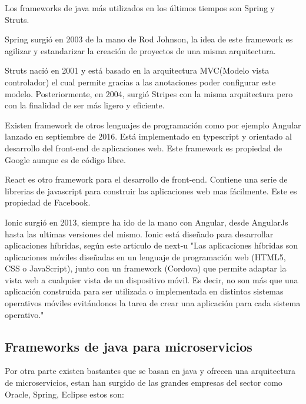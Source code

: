 \documentclass[12pt]{report} %
\begin{document}
 Los frameworks de java más utilizados en los últimos tiempos son Spring y Struts.
 
 Spring surgió en 2003 de la mano de Rod Johnson, la idea de este framework es agilizar y estandarizar la creación de proyectos de una misma arquitectura. 
 
 Struts nació en 2001 y está basado en la arquitectura MVC(Modelo vista controlador) el cual permite gracias a las anotaciones poder configurar este modelo. Posteriormente, en 2004, surgió Stripes con la misma arquitectura pero con la finalidad de ser más ligero y eficiente.
 
 Existen framework de otros lenguajes de programación como por ejemplo Angular lanzado en septiembre de 2016. Está implementado en typescript y orientado al desarrollo del front-end de aplicaciones web. Este framework es propiedad de Google aunque es de código libre.
 
 React es otro framework para el desarrollo de front-end. Contiene una serie de librerias de javascript para construir las aplicaciones web mas fácilmente. Este es propiedad de Facebook.
 
 Ionic surgió en 2013, siempre ha ido de la mano con Angular, desde AngularJs hasta las ultimas versiones del mismo. Ionic está diseñado para desarrollar aplicaciones híbridas, según este articulo de next-u \cite{AppHibridas} "Las aplicaciones híbridas son aplicaciones móviles diseñadas en un lenguaje de programación web (HTML5, CSS o JavaScript), junto con un framework (Cordova) que permite adaptar la vista web a cualquier vista de un dispositivo móvil. Es decir, no son más que una aplicación construida para ser utilizada o implementada en distintos sistemas operativos móviles evitándonos la tarea de crear una aplicación para cada sistema operativo."
 
 \subsection{Frameworks de java para microservicios}
 Por otra parte existen bastantes que se basan en java y ofrecen una arquitectura de microservicios, estan han surgido de las grandes empresas del sector como Oracle, Spring, Eclipse estos son:
\end{document}
